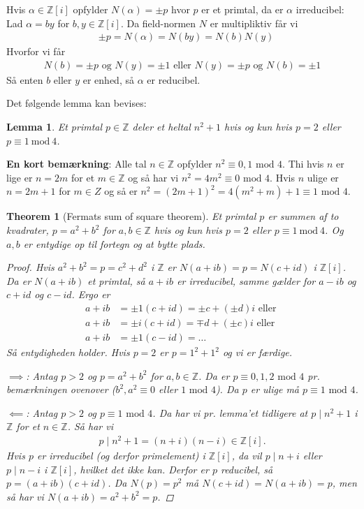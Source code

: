 \documentclass[10pt,twoside,openany,final]{memoir}
\theoremstyle{break}
\newtheorem{theorem}[section]{Theorem}
\newtheorem{lemma}[section]{Lemma}
\theoremstyle{Break}
\newcommand{\Z}{\mathbb{Z}}
\begin{document}
Hvis $\alpha \in \Z[i]$ opfylder $N(\alpha)=\pm p$ hvor $p$ er et primtal, da er $\alpha$ irreducibel: Lad $\alpha=b y$ for $b,y \in \Z[i]$. Da field-normen $N$ er multipliktiv får vi
\begin{align*}
&\pm p=N(\alpha)=N(by)=N(b)N(y)
\end{align*}
Hvorfor vi får
\begin{align*}
N(b) = \pm p \text{ og }  N(y) = \pm 1  \text{ eller }  N(y)=\pm p\text{ og } N(b)=\pm 1
\end{align*}
Så enten $b$ eller $y$ er enhed, så $\alpha$ er reducibel.

Det følgende lemma kan bevises:
\begin{lemma}
Et primtal $p \in \Z$ deler et heltal $n^2+1$ hvis og kun hvis $p =2$ eller $p \equiv 1\ \textrm{mod}\ 4$.
\end{lemma}

\textbf{En kort bemærkning}: Alle tal $n \in \Z$ opfylder $n^2\equiv 0,1 \textrm{ mod } 4$. Thi hvis $n$ er lige er $n=2m$ for et $m \in \Z$ og så har vi $n^2=4m^2 \equiv 0 \textrm{ mod } 4$. Hvis $n$ ulige er $n=2m+1$ for $m \in Z$ og så er $n^2=(2m+1)^2=4(m^2+m)+1 \equiv 1 \textrm{ mod } 4$. 

\begin{theorem}[Fermats sum of square theorem]
Et primtal $p$ er summen af to kvadrater, $p=a^2+b^2$ for $a,b \in \Z$ hvis og kun hvis $p=2$ eller $p \equiv 1\ \textrm{mod} \ 4$. Og $a,b$ er entydige op til fortegn og at bytte plads.
\begin{proof}
Hvis $a^2+b^2=p=c^2+d^2$ i $\Z$ er $N(a+ib)=p=N(c+id)$ i $\Z[i]$. Da er $N(a+ib)$ et primtal, så $a+ib$ er irreducibel, samme gælder for $a-ib$ og $c+id$ og $c-id$. Ergo er
\begin{align*}
a+ib&=\pm 1(c+id) =\pm c+(\pm d) i \textrm{ eller } \\
a+ib&=\pm i(c+id) =\mp d+(\pm c) i \textrm{ eller } \\
a+ib&=\pm 1(c-id) =\dots
\end{align*}
Så entydigheden holder. Hvis $p=2$ er $p=1^2+1^2$ og vi er færdige. 

\noindent $\implies$: Antag $p > 2$ og $p=a^2+b^2$ for $a,b \in \Z$. Da er $p \equiv 0,1,2 \textrm{ mod } 4$ pr. bemærkningen ovenover ($b^2,a^2 \equiv 0$ eller $1 \textrm{ mod } 4$). Da $p$ er ulige må $p \equiv 1 \textrm{ mod } 4$. 

\noindent $\impliedby$: Antag $p>2$ og $p\equiv 1 \textrm{ mod } 4$. Da har vi pr. lemma'et tidligere at $p \mid n^2+1$ i $\Z$ for et $n \in \Z$. Så har vi
\begin{align*}
p \mid n^2+1=(n+i)(n-i) \in \Z[i].
\end{align*}
Hvis $p$ er irreducibel (og derfor primelement) i $\Z[i]$, da vil $p \mid n+i$ eller $p \mid n-i$ i $\Z[i]$, hvilket det ikke kan. Derfor er $p$ reducibel, så $p = (a+ib)(c+id)$. Da $N(p)=p^2$ må $N(c+id)=N(a+ib)= p$, men så har vi $N(a+ib)=a^2+b^2=p$.
\end{proof}  
\end{theorem}	
\end{document}
